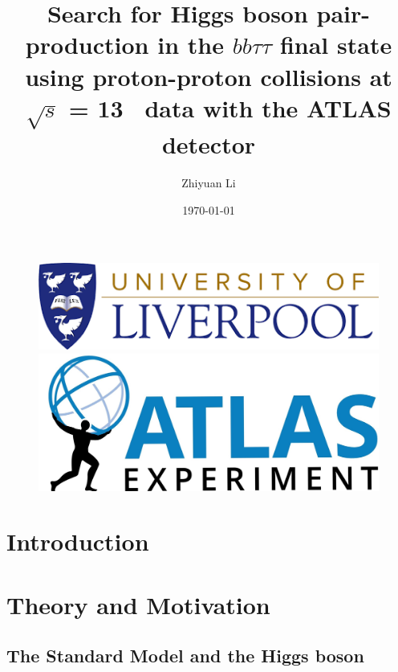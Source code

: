 \documentclass[letterpaper,12pt]{article}
\begin{document}
\title{Search for Higgs boson pair-production in the $bb\tau\tau$ final state using proton-proton collisions at $\sqrt{s}$ = 13 \TeV\ data with the ATLAS detector}%
\author{ Zhiyuan Li}
\date{\today}
\maketitle
\begin{figure}[htp]
\begin{minipage}[b]{.5\textwidth}
\centering
\includegraphics[width=1\textwidth]{logo.png}
\end{minipage}\hfill
\begin{minipage}[b]{.45\textwidth}
\vspace{3em}
\centering
\includegraphics[width=1\textwidth]{ATLAS-Logo-Ref-RGB-H_1.jpg}
\end{minipage}
\end{figure}
\newpage


\tableofcontents{}
\printindex{}


\newpage
\section{Introduction}
\section{Theory and Motivation}
\subsection{The Standard Model and the Higgs boson}
\end{document}
